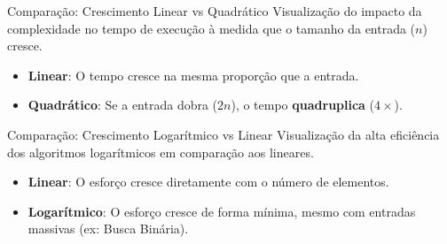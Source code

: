 \documentclass[9pt]{beamer}
\begin{document}
\begin{frame}{Comparação: Crescimento Linear vs Quadrático}
    Visualização do impacto da complexidade no tempo de execução à medida que o tamanho da entrada ($n$) cresce.
    \vspace{0.4cm}
    \begin{center}
    \end{center}
    \begin{itemize}
        \item \textbf{Linear}: O tempo cresce na mesma proporção que a entrada.
        \item \textbf{Quadrático}: Se a entrada dobra ($2n$), o tempo \textbf{quadruplica} ($4 \times$).
    \end{itemize}
\end{frame}

\begin{frame}{Comparação: Crescimento Logarítmico vs Linear}
    Visualização da alta eficiência dos algoritmos logarítmicos em comparação aos lineares.
    \begin{center}
    \end{center}
    \begin{itemize}
        \item \textbf{Linear}: O esforço cresce diretamente com o número de elementos.
        \item \textbf{Logarítmico}: O esforço cresce de forma mínima, mesmo com entradas massivas (ex: Busca Binária).
    \end{itemize}
\end{frame}
\end{document}

